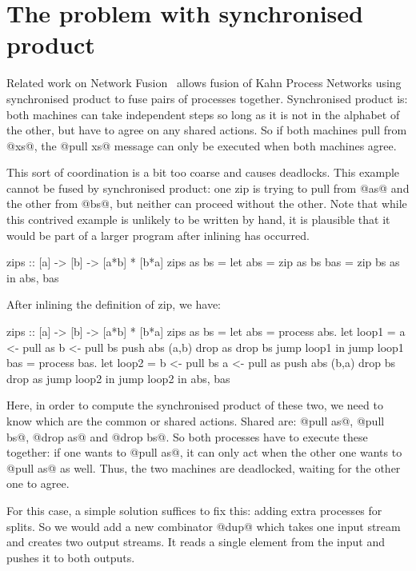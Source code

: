 \section{The problem with synchronised product}
Related work on Network Fusion~\cite{fradet2004network} allows fusion of Kahn Process Networks using synchronised product to fuse pairs of processes together.
Synchronised product is: both machines can take independent steps so long as it is not in the alphabet of the other, but have to agree on any shared actions.
So if both machines pull from @xs@, the @pull xs@ message can only be executed when both machines agree.

This sort of coordination is a bit too coarse and causes deadlocks.
This example cannot be fused by synchronised product: one zip is trying to pull from @as@ and the other from @bs@, but neither can proceed without the other.
Note that while this contrived example is unlikely to be written by hand, it is plausible that it would be part of a larger program after inlining has occurred.

\begin{code}
zips :: [a] -> [b] -> [a*b] * [b*a]
zips as bs =
  let abs = zip as bs
      bas = zip bs as
  in  abs, bas
\end{code}

After inlining the definition of zip, we have:
\begin{code}
zips :: [a] -> [b] -> [a*b] * [b*a]
zips as bs =
  let abs = process abs.
       let loop1 =
          a <- pull as
          b <- pull bs
          push abs (a,b)
          drop as
          drop bs
          jump loop1
       in jump loop1
      bas = process bas.
       let loop2 =
          b <- pull bs
          a <- pull as
          push abs (b,a)
          drop bs
          drop as
          jump loop2
       in jump loop2
  in  abs, bas
\end{code}

Here, in order to compute the synchronised product of these two, we need to know which are the common or shared actions.
Shared are: @pull as@, @pull bs@, @drop as@ and @drop bs@.
So both processes have to execute these together: if one wants to @pull as@, it can only act when the other one wants to @pull as@ as well.
Thus, the two machines are deadlocked, waiting for the other one to agree.

For this case, a simple solution suffices to fix this: adding extra processes for splits. So we would add a new combinator @dup@ which takes one input stream and creates two output streams. It reads a single element from the input and pushes it to both outputs.

